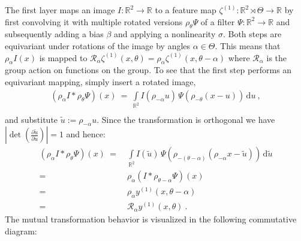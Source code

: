 \documentclass[10pt,twocolumn,letterpaper]{article}
\newcommand{\R}{\mathbb{R}}
\begin{document}
The first layer maps an image $I:\mathbb{R}^2\to\mathbb{R}$ to a feature map $\zeta^{(1)}:\mathbb{R}^2\rtimes\Theta\to\mathbb{R}$ by first convolving it with multiple rotated versions $\rho_\theta\Psi$ of a filter $\Psi:\mathbb{R}^2\to\mathbb{R}$ and subsequently adding a bias $\beta$ and applying a nonlinearity $\sigma$.
Both steps are equivariant under rotations of the image by angles $\alpha\in\Theta$.
This means that $\rho_\alpha I(x)$ is mapped to $\mathcal{R}_\alpha \zeta^{(1)}(x,\theta) = \rho_\alpha \zeta^{(1)}(x,\theta-\alpha)$ where $\mathcal{R}_\alpha$ is the group action on functions on the group.
To see that the first step performs an equivariant mapping, simply insert a rotated image,
\begin{align*}
	\left(\rho_\alpha I \ast \rho_\theta\Psi\right)(x) 
	\ =\ \int\limits_{\R^2} I(\rho_{-\alpha}u)\, \Psi(\rho_{-\theta}(x-u))\, \mathrm{d}u \ , \\
\end{align*}
and substitute $\tilde{u}:=\rho_{-\alpha}u$.
Since the transformation is orthogonal we have $\left|\det\left(\frac{\partial \tilde{u}}{\partial u}\right)\right|=1$ and hence:
\begin{align*}
	\left(\rho_\alpha I \ast \rho_\theta\Psi\right)(x) 
	\ =\ & \int\limits_{\R^2} I(\tilde{u})\, \Psi(\rho_{-(\theta-\alpha)}(\rho_{-\alpha}x-\tilde{u}))\, \mathrm{d}\tilde{u} \\
	=\ & \rho_\alpha \left(I \ast \rho_{\theta-\alpha}\Psi\right)(x) \\
	=\ & \rho_\alpha y^{(1)}(x,\theta-\alpha) \\
	=\ & \mathcal{R}_\alpha y^{(1)}(x,\theta)\ .
\end{align*}
The mutual transformation behavior is visualized in the following commutative diagram:
\begin{center}
\end{center}
\end{document}
